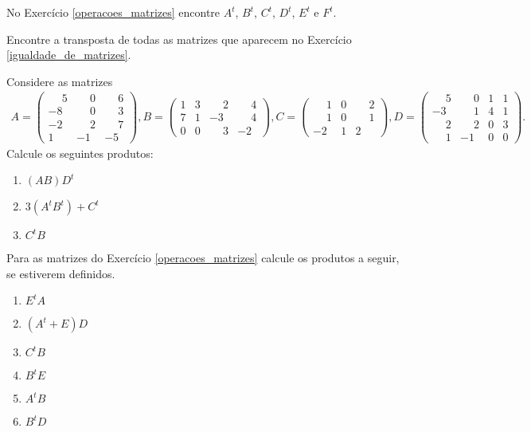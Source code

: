 \documentclass[12pt]{exam}
\begin{document}
\begin{exercicio}
    No Exercício \ref{operacoes_matrizes} encontre $A^t$, $B^t$, $C^t$, $D^t$, $E^t$ e $F^t$.
\end{exercicio}

\begin{exercicio}
    Encontre a transposta de todas as matrizes que aparecem no Exercício \ref{igualdade_de_matrizes}.
\end{exercicio}

\begin{exercicio}
    Considere as matrizes
    \begin{align*}
        A = \begin{pmatrix}\phantom{-} 5 & \phantom{-} 0 & \phantom{-} 6\\-8 & \phantom{-} 0 & \phantom{-} 3\\-2 & \phantom{-} 2 & \phantom{-} 7\\1 & -1 & -5\end{pmatrix},
        B = \begin{pmatrix}1 & 3 & \phantom{-} 2 & \phantom{-} 4\\7 & 1 & -3 & \phantom{-} 4\\0 & 0 & \phantom{-} 3 & -2\end{pmatrix},
        C = \begin{pmatrix}\phantom{-} 1 & 0 & \phantom{-} 2\\\phantom{-} 1 & 0 & \phantom{-} 1\\-2 & 1 & 2\end{pmatrix},
        D = \begin{pmatrix}\phantom{-} 5 & \phantom{-} 0 & 1 & 1\\-3 & \phantom{-} 1 & 4 & 1\\\phantom{-} 2 & \phantom{-} 2 & 0 & 3\\\phantom{-} 1 & -1 & 0 & 0\end{pmatrix}.
    \end{align*}
    Calcule os seguintes produtos:
    \begin{enumerate}[label={\alph*})]
        \item $(AB)D^t$
        \item $3(A^tB^t) + C^t$
        \item $C^tB$
    \end{enumerate}
\end{exercicio}

\begin{exercicio}
    Para as matrizes do Exercício \ref{operacoes_matrizes} calcule os produtos a seguir, se estiverem definidos.
    \begin{enumerate}[label={\alph*})]
        \item $E^tA$
        \item $(A^t + E)D$
        \item $C^tB$
        \item $B^tE$
        \item $A^tB$
        \item $B^tD$
    \end{enumerate}
\end{exercicio}
\end{document}
